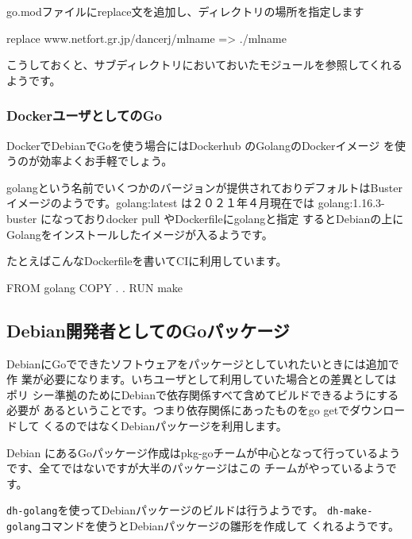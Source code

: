 \documentclass[mingoth,a4paper]{jsarticle}
\begin{document}
go.modファイルにreplace文を追加し、ディレクトリの場所を指定します

\begin{commandline}
 replace www.netfort.gr.jp/dancerj/mlname => ./mlname
\end{commandline}

こうしておくと、サブディレクトリにおいておいたモジュールを参照してくれる
ようです。

\subsubsection{DockerユーザとしてのGo}

DockerでDebianでGoを使う場合にはDockerhub のGolangのDockerイメージ
\cite{docker:go}を使うのが効率よくお手軽でしょう。

golangという名前でいくつかのバージョンが提供されておりデフォルトはBuster
イメージのようです。golang:latest は２０２１年４月現在では
golang:1.16.3-buster になっておりdocker pull やDockerfileにgolangと指定
するとDebianの上にGolangをインストールしたイメージが入るようです。

たとえばこんなDockerfileを書いてCIに利用しています。

\begin{commandline}
FROM golang
COPY . .
RUN make
\end{commandline}


\subsection{Debian開発者としてのGoパッケージ}

DebianにGoでできたソフトウェアをパッケージとしていれたいときには追加で作
業が必要になります。いちユーザとして利用していた場合との差異としてはポリ
シー準拠のためにDebianで依存関係すべて含めてビルドできるようにする必要が
あるということです。つまり依存関係にあったものをgo getでダウンロードして
くるのではなくDebianパッケージを利用します。

Debian にあるGoパッケージ作成はpkg-goチームが中心となって行っているよう
です\cite{debian-go-packaging}、全てではないですが大半のパッケージはこの
チームがやっているようです。

\texttt{dh-golang}を使ってDebianパッケージのビルドは行うようです。
\texttt{dh-make-golang}コマンドを使うとDebianパッケージの雛形を作成して
くれるようです。
\end{document}
